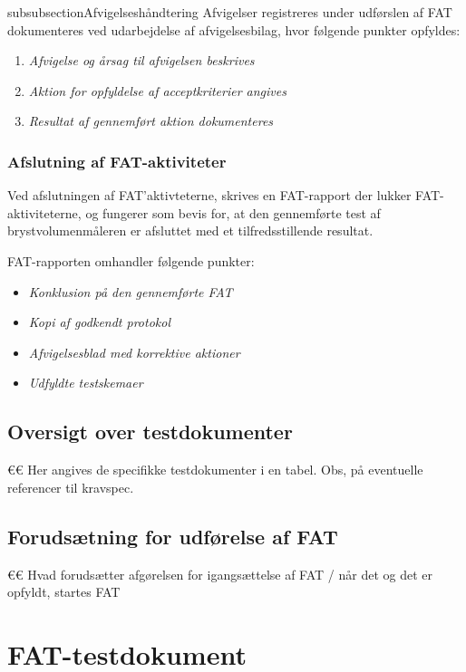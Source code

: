 			subsubsection{Afvigelseshåndtering}	
			Afvigelser registreres under udførslen af FAT dokumenteres ved udarbejdelse af afvigelsesbilag, hvor følgende punkter opfyldes:
			
			\begin{enumerate}[label=\alph*)]
				\item \textit{Afvigelse og årsag til afvigelsen beskrives}
				\item \textit{Aktion for opfyldelse af acceptkriterier angives}
				\item \textit{Resultat af gennemført aktion dokumenteres}	
			\end{enumerate}
			
			\subsubsection{Afslutning af FAT-aktiviteter}
			Ved afslutningen af FAT'aktivteterne, skrives en FAT-rapport der lukker FAT-aktiviteterne, og fungerer som bevis for, at den gennemførte test af brystvolumenmåleren er afsluttet med et tilfredsstillende resultat. 
			
			FAT-rapporten omhandler følgende punkter: 
			\begin{itemize}
				\item \textit{Konklusion på den gennemførte FAT}
				\item \textit{Kopi af godkendt protokol}
				\item \textit{Afvigelsesblad med korrektive aktioner}
				\item \textit{Udfyldte testskemaer}
			\end{itemize}
			
		\subsection{Oversigt over testdokumenter}
		€€ Her angives de specifikke testdokumenter i en tabel. Obs, på eventuelle referencer til kravspec. 
		
		\subsection{Forudsætning for udførelse af FAT}
		€€ Hvad forudsætter afgørelsen for igangsættelse af FAT / når det og det er opfyldt, startes FAT 
		
		\section{FAT-testdokument}
		
				
	
	
		
	
		
	
		